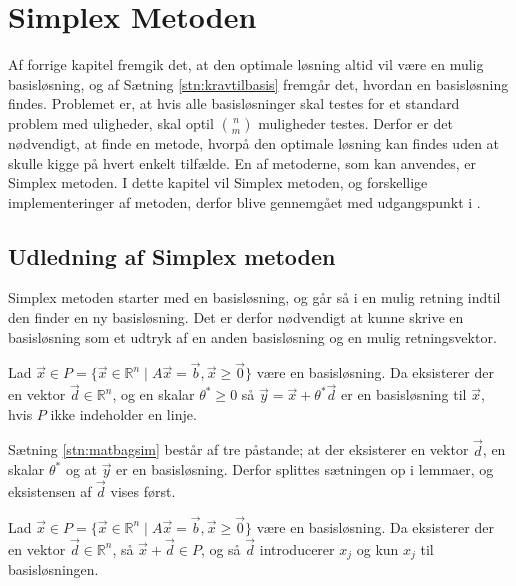 \chapter{Simplex Metoden}
Af forrige kapitel fremgik det, at den optimale løsning altid vil være en mulig basisløsning, og af Sætning \ref{stn:kravtilbasis}
fremgår det, hvordan en basisløsning findes. 
Problemet er, at hvis alle basisløsninger skal testes for et standard problem med uligheder, skal optil $\binom{n}{m}$ muligheder testes. 
Derfor er det nødvendigt, at finde en metode, hvorpå den optimale løsning kan findes uden at skulle kigge på hvert enkelt tilfælde. 
En af metoderne, som kan anvendes, er Simplex metoden. I dette kapitel vil Simplex metoden, og forskellige implementeringer af metoden, derfor blive gennemgået med udgangspunkt i .
\section{Udledning af Simplex metoden}
Simplex metoden starter med en basisløsning, og går så i en mulig retning indtil den finder en ny basisløsning.
Det er derfor nødvendigt at kunne skrive en basisløsning som et udtryk af en anden basisløsning og en mulig retningsvektor.
\begin{stn}
Lad $\vec{x} \in P =\{\vec{x}\in \mathds{R}^n \mid A\vec{x}= \vec{b}, \vec{x}\geq \vec{0}\}$ være en basisløsning. Da eksisterer der en vektor $\vec{d}\in \mathds{R}^n$, og en skalar $\theta^*\geq 0$ så $\vec{y}= \vec{x} + \theta^* \vec{d}$ er en basisløsning til $\vec{x}$, hvis $P$ ikke indeholder en linje.
\label{stn:matbagsim}
\end{stn}
Sætning \ref{stn:matbagsim} består af tre påstande; at der eksisterer en vektor $\vec{d}$, en skalar $\theta^*$ og at $\vec{y}$ er en basisløsning.
Derfor splittes sætningen op i lemmaer, og eksistensen af $\vec{d}$ vises først.
\begin{lma}
Lad $\vec{x} \in P =\{\vec{x}\in \mathds{R}^n \mid A\vec{x}= \vec{b}, \vec{x}\geq \vec{0}\}$ være en basisløsning. Da eksisterer der en vektor $\vec{d}\in \mathds{R}^n$, så $\vec{x} + \vec{d} \in P$, og så $\vec{d}$ introducerer $x_j$ og kun $x_j$ til basisløsningen.
\label{lma:retningsvektor}
\end{lma}
